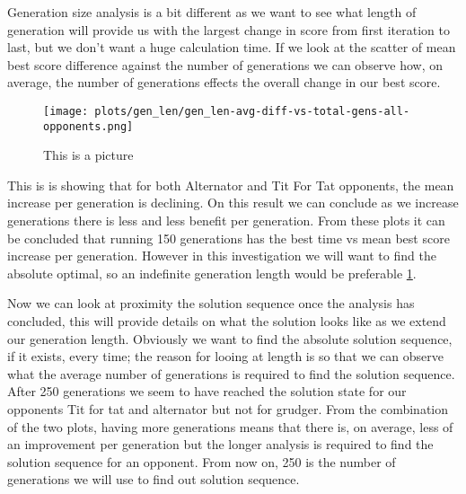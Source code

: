     
    Generation size analysis is a bit different as we want to see what length of generation will provide us with the largest change in score from first iteration to last, but we don't want a huge calculation time. If we look at the scatter of mean best score difference against the number of generations we can observe how, on average, the number of generations effects the overall change in our best score.\\ 

    \begin{figure}[!hbtp]
        \texttt{[image: plots/gen\_len/gen\_len-avg-diff-vs-total-gens-all-opponents.png]}      \caption{This is a picture}
        \label{fig:pic1}
    \end{figure}

    This is is showing that for both Alternator and Tit For Tat opponents, the mean increase per generation is declining. On this result we can conclude as we increase generations there is less and less benefit per generation. From these plots it can be concluded that running 150 generations has the best time vs mean best score increase per generation. However in this investigation we will want to find the absolute optimal, so an indefinite generation length would be preferable \ref{fig:pic1}.
        
    Now we can look at proximity the solution sequence once the analysis has concluded, this will provide details on what the solution looks like as we extend our generation length. Obviously we want to find the absolute solution sequence, if it exists, every time; the reason for looing at length is so that we can observe what the average number of generations is required to find the solution sequence.\\
    
    
    After 250 generations we seem to have reached the solution state for our opponents Tit for tat and alternator but not for grudger. From the combination of the two plots, having more generations means that there is, on average, less of an improvement per generation but the longer analysis is required to find the solution sequence for an opponent. From now on, 250 is the number of generations we will use to find out solution sequence.\\ 

